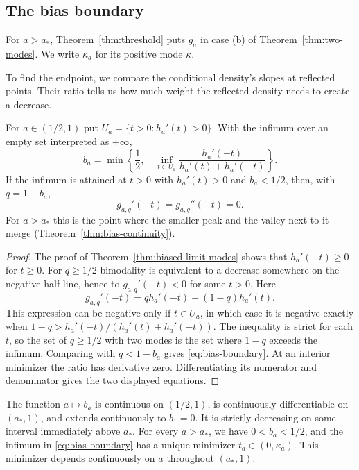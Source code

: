 \subsection{The bias boundary}

For $a>a_*$, Theorem~\ref{thm:threshold} puts $g_a$ in case (b) of
Theorem~\ref{thm:two-modes}. We write $\kappa_a$ for its positive
mode $\kappa$.

To find the endpoint, we compare the conditional density's slopes
at reflected points. Their ratio tells us how much weight the
reflected density needs to create a decrease.

\begin{proposition}
\label{prop:bias-boundary}
For $a\in(1/2,1)$ put $U_a=\{t>0:h_a'(t)>0\}$. With the infimum
over an empty set interpreted as $+\infty$,
\begin{equation}\label{eq:bias-boundary}
 b_a=\min\left\{\frac12,\quad
       \inf_{t\in U_a}\frac{h_a'(-t)}{h_a'(t)+h_a'(-t)}\right\}.
\end{equation}
If the infimum is attained
at $t>0$ with $h_a'(t)>0$ and $b_a<1/2$, then, with $q=1-b_a$,
\[
 g_{a,q}'(-t)=g_{a,q}''(-t)=0.
\]
For $a>a_*$ this is the point where the smaller peak and the valley
next to it merge (Theorem~\ref{thm:bias-continuity}).
\end{proposition}

\begin{proof}
The proof of Theorem~\ref{thm:biased-limit-modes} shows that
$h_a'(-t)\ge0$ for $t\ge0$. For $q\ge1/2$ bimodality is equivalent
to a decrease somewhere on the negative half-line, hence to
$g_{a,q}'(-t)<0$ for some $t>0$. Here
\[
 g_{a,q}'(-t)=q h_a'(-t)-(1-q)h_a'(t).
\]
This expression can be negative only if $t\in U_a$, in which case
it is negative exactly when
$1-q>h_a'(-t)/(h_a'(t)+h_a'(-t))$. The inequality is strict for each $t$, so the set of
$q\ge1/2$ with two modes is the set where $1-q$ exceeds the infimum.
Comparing with $q<1-b_a$ gives \eqref{eq:bias-boundary}. At an interior minimizer the
ratio has derivative zero. Differentiating its numerator and
denominator gives the two displayed equations.
\end{proof}

\begin{theorem}\label{thm:bias-continuity}
The function $a\mapsto b_a$ is continuous on $(1/2,1)$, is continuously
differentiable on $(a_*,1)$, and extends continuously to $b_1=0$.
It is strictly decreasing on some interval immediately above $a_*$.
For every $a>a_*$, we have $0<b_a<1/2$,
and the infimum in
\eqref{eq:bias-boundary} has a unique minimizer $t_a\in(0,\kappa_a)$.
This minimizer depends continuously on $a$ throughout $(a_*,1)$.
\end{theorem}


